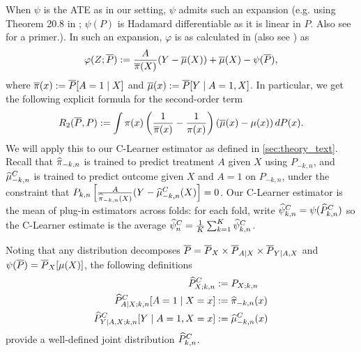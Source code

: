 When $\psi$ is the ATE as in our setting, $\psi$ admits such an expansion (e.g. using Theorem 20.8 in \citet{VanDerVaart98}; $\psi(P)$ is Hadamard differentiable as it is linear in $P$. Also see \citep{Kennedy22} for a primer.).
In such an expansion, $\varphi$ is as calculated in \citep{Hahn98} (also see \citep{Kennedy22}) as
\begin{align}
\label{eq:full_if}
\varphi(Z;\overline{P}):=\frac{A}{\overline{\pi}(X)}(Y-\overline{\mu}(X))+\overline{\mu}(X)-\psi(\overline{P}),
\end{align}
where $\overline{\pi}(x):=\overline{P}[A=1\mid X]$
and $\overline{\mu}(x):=\overline{P}[Y\mid A=1,X]$. In particular, we get the following explicit formula for the second-order term
\begin{align}
R_2(\overline{P},P) := \int \pi(x) \left( \frac{1}{\overline{\pi}(x)} - \frac{1}{\pi(x)} \right) \left( \overline{\mu} (x) - \mu(x) \right) dP(x).
\end{align}
We will apply this to our C-Learner estimator as defined in \cref{sec:theory_text}. Recall that
$\widehat{\pi}_{-k,n}$ is trained to predict treatment $A$ given $X$ using $P_{-k,n}$, and $\widehat{\mu}_{-k,n}^C$ is trained to predict outcome given $X$ and $A=1$ on $P_{-k,n}$, under the constraint that $P_{k,n}\left[\frac{A}{\widehat{\pi}_{-k,n}(X)}(Y-\widehat{\mu}_{-k,n}^C(X)\right]=0$.
Our C-Learner estimator is the mean of plug-in estimators across folds: for each fold, write $\widehat{\psi}^C_{k,n}=\psi(\widehat{P}_{k,n}^C)$ so the C-Learner estimate is the average $\widehat{\psi}^C_n=\frac{1}{K}\sum_{k=1}^K \widehat{\psi}^C_{k,n}$. 


Noting that any distribution decomposes $\overline{P}=\overline{P}_X\times \overline{P}_{A\mid X}\times \overline{P}_{Y\mid A,X}$ and $\psi(\overline{P})=\overline{P}_X[\mu(X)]$, the following definitions
\begin{align*}
\widehat{P}^C_{X;k,n}&:=P_{X;k,n} \\
\widehat{P}^C_{A\mid X ;k,n}[A=1\mid X=x]&:=\widehat{\pi}_{-k,n}(x) \\ 
\widehat{P}^C_{Y\mid A,X ;k,n}[Y\mid A=1, X=x]&:=\widehat{\mu}_{-k,n}^C(x)
\end{align*}
provide a well-defined joint distribution  $\widehat{P}^C_{k,n}$.

